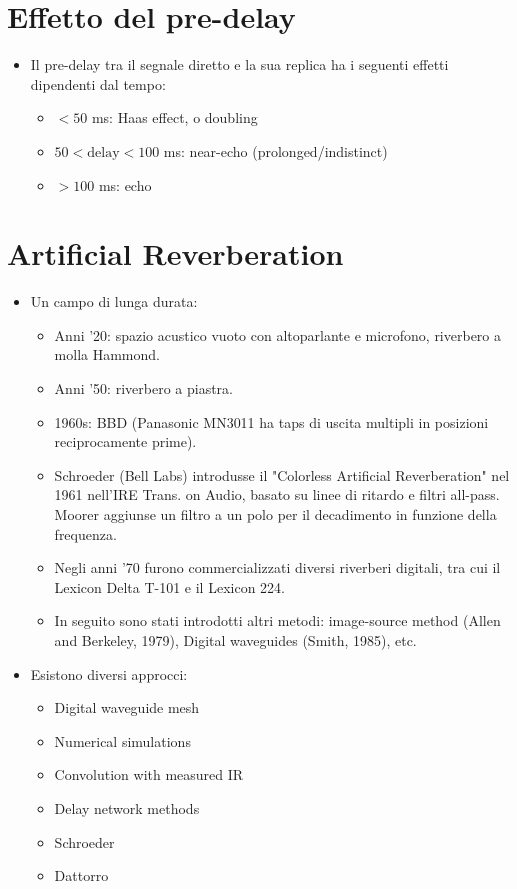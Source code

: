 \section{Effetto del pre-delay}
\begin{itemize}
    \item Il pre-delay tra il segnale diretto e la sua replica ha i seguenti effetti dipendenti dal tempo:
    \begin{itemize}
        \item $< 50$ ms: Haas effect, o doubling
        \item $50 < \text{delay} < 100$ ms: near-echo (prolonged/indistinct)
        \item $> 100$ ms: echo
    \end{itemize}
\end{itemize}


\section*{Artificial Reverberation}

\begin{itemize}
    \item Un campo di lunga durata:
    \begin{itemize}
        \item Anni '20: spazio acustico vuoto con altoparlante e microfono, riverbero a molla Hammond.
        \item Anni '50: riverbero a piastra.
        \item 1960s: BBD (Panasonic MN3011 ha taps di uscita multipli in posizioni reciprocamente prime).
        \item Schroeder (Bell Labs) introdusse il "Colorless Artificial Reverberation" nel 1961 nell'IRE Trans. on Audio, basato su linee di ritardo e filtri all-pass. Moorer aggiunse un filtro a un polo per il decadimento in funzione della frequenza.
        \item Negli anni '70 furono commercializzati diversi riverberi digitali, tra cui il Lexicon Delta T-101 e il Lexicon 224.
        \item In seguito sono stati introdotti altri metodi: image-source method (Allen and Berkeley, 1979), Digital waveguides (Smith, 1985), etc.
    \end{itemize}
    
    \item Esistono diversi approcci:
    \begin{itemize}
        \item Digital waveguide mesh
        \item Numerical simulations
        \item Convolution with measured IR
        \item Delay network methods
        \item Schroeder
        \item Dattorro
    \end{itemize}
\end{itemize}

